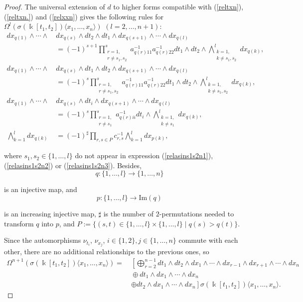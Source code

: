 \documentclass{amsart}
\theoremstyle{definition}
\theoremstyle{remark}
\numberwithin{equation}{section}
\begin{document}
\begin{proof}
The universal extension of $d$ to higher forms compatible with {\rm (}\ref{reltxn}{\rm )}, {\rm (}\ref{reltxn.}{\rm )} and {\rm (}\ref{relxxn}{\rm )} gives the following rules for $\Omega^l(\sigma(\Bbbk[t_1, t_2])\langle x_1, \ldots, x_n\rangle)$ $(l = 2, \ldots, n+1)$:
\begin{align}
 dx_{q(1)}\wedge \dotsb \wedge &\ dx_{q(s)}\wedge dt_2 \wedge dt_1 \wedge dx_{q(s+1)}\wedge \dotsb \wedge dx_{q(l)} \\
 &\ = (-1)^{s+1}\prod_{\substack{r=1,\\r \ne s_1, s_2}}^{s} a_{q(r)11}^{-1}a_{q(r)22}^{-1} dt_1 \wedge dt_2 \wedge \bigwedge_{\substack{k=1,\\k \ne s_1, s_2}}^{l}dx_{q(k)},\label{relasins1s2n1}  \\
 dx_{q(1)}\wedge \dotsb \wedge &\ dx_{q(s)}\wedge dt_1 \wedge dt_2 \wedge dx_{q(s+1)}\wedge \dotsb \wedge dx_{q(l)} \\
 &\ = (-1)^{s}\prod_{\substack{r=1,\\r \ne s_1, s_2}}^{s} a_{q(r)11}^{-1}a_{q(r)22}^{-1} dt_1 \wedge dt_2 \wedge \bigwedge_{\substack{k=1,\\k \ne s_1, s_2}}^{l}dx_{q(k)}, \label{relasins1s2n2}  \\
 dx_{q(1)}\wedge \dotsb \wedge &\ dx_{q(s)}\wedge dt_i  \wedge dx_{q(s+1)} \wedge \dotsb \wedge dx_{q(l)} \\
 &\ = (-1)^{s}\prod_{\substack{r=1,\\r \ne s_1}}^{s} a_{q(r)ii}^{-1} dt_i \wedge \bigwedge_{\substack{k=1,\\k \ne s_1}}^{l}dx_{q(k)}, \label{relasins1s2n3}  \\
   \bigwedge_{k=1}^{l}dx_{q(k)} &\ = (-1)^{\sharp}\prod_{r,s\in P}c_{r,s}^{-1}\bigwedge_{k=1}^ldx_{p(k)},
\end{align}

where $s_1, s_2 \in \{1,\ldots,l\}$ do not appear in expression {\rm (}\ref{relasins1s2n1}{\rm )}, {\rm (}\ref{relasins1s2n2}{\rm )} or {\rm (}\ref{relasins1s2n3}{\rm )}. Besides, 
$$
q:\{1,\ldots,l\}\rightarrow \{1,\ldots,n\}
$$ 

is an injective map, and 
$$
p:\{1,\ldots,l\}\rightarrow \text{Im}(q)
$$ 

is an increasing injective map, $\sharp$ is the number of $2$-permutations needed to transform $q$ into $p$, and $P := \{(s, t) \in \{1, \ldots, l\} \times \{1, \ldots, l\} \mid q(s) >  q(t)\}$.

Since the automorphisms $\nu_{t_i}$, $\nu_{x_j}$, $i\in\{1, 2\}, j \in\{1, \ldots, n\}$ commute with each other, there are no additional relationships to the previous ones, so 
{\small{
\begin{align*}
\Omega^{n+1} (\sigma(\Bbbk[t_1, t_2])\langle x_1,\ldots, x_n\rangle) = &\ \left[\bigoplus_{r=2}^{n-1}dt_1\wedge dt_2 \wedge dx_1 \wedge \cdots \wedge dx_{r-1}\wedge dx_{r+1} \wedge \cdots \wedge dx_{n} \right. \\
&\   \oplus dt_1 \wedge dx_1 \wedge \cdots\wedge dx_{n} \\
&\ \left. \oplus dt_2 \wedge dx_1 \wedge \cdots \wedge dx_{n}\right]\sigma(\Bbbk[t_1, t_2])\langle x_1,\ldots, x_n\rangle.
\end{align*}
}}


\end{proof}
\end{document}
